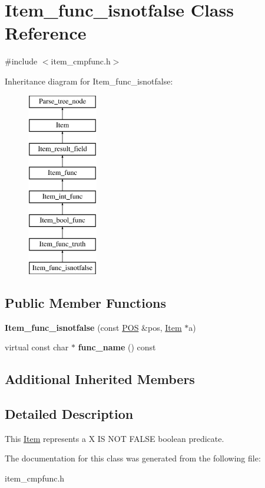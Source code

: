 \hypertarget{classItem__func__isnotfalse}{}\section{Item\+\_\+func\+\_\+isnotfalse Class Reference}
\label{classItem__func__isnotfalse}


{\ttfamily \#include $<$item\+\_\+cmpfunc.\+h$>$}

Inheritance diagram for Item\+\_\+func\+\_\+isnotfalse\+:\begin{figure}[H]
\begin{center}
\leavevmode
\includegraphics[height=8.000000cm]{classItem__func__isnotfalse}
\end{center}
\end{figure}
\subsection*{Public Member Functions}
\begin{DoxyCompactItemize}
\item 
\mbox{\label{classItem__func__isnotfalse_a16f7de9ab5c45c645f54ecd02bf4c796}} 
{\bfseries Item\+\_\+func\+\_\+isnotfalse} (const \mbox{\hyperlink{structYYLTYPE}{P\+OS}} \&pos, \mbox{\hyperlink{classItem}{Item}} $\ast$a)
\item 
\mbox{\label{classItem__func__isnotfalse_a4a45e152eeb9f5f3b89e3b2e527c6224}} 
virtual const char $\ast$ {\bfseries func\+\_\+name} () const
\end{DoxyCompactItemize}
\subsection*{Additional Inherited Members}


\subsection{Detailed Description}
This \mbox{\hyperlink{classItem}{Item}} represents a {\ttfamily X IS N\+OT F\+A\+L\+SE} boolean predicate. 

The documentation for this class was generated from the following file\+:\begin{DoxyCompactItemize}
\item 
item\+\_\+cmpfunc.\+h\end{DoxyCompactItemize}
